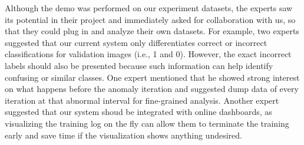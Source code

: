 \documentclass[format=acmsmall, review=false, screen=true]{acmart}
\newcommand{\name}{{DeepTracker}\xspace}
\newcommand{\dy}{\textcolor[rgb]{0,0,0}}
\begin{document}
Although the demo was performed on our experiment datasets, the experts saw its potential in their project and immediately asked for collaboration with us, so that they could plug in and analyze their own datasets.
For example, two experts suggested that our current system only differentiates correct or incorrect classifications for validation images (i.e., 1 and 0).
However, the exact incorrect labels should also be presented because such information can help identify confusing or similar classes.
One expert mentioned that he showed strong interest on what happens before the anomaly iteration and suggested dump data of every iteration at that abnormal interval for fine-grained analysis.
Another expert suggested that our system shoud be integrated with online dashboards, as visualizing the training log on the fly can allow them to terminate the training early and save time if the visualization shows anything undesired.
\end{document}
